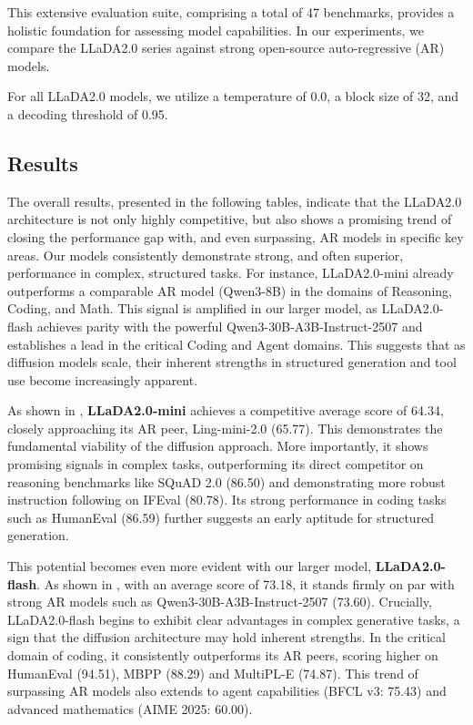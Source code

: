 This extensive evaluation suite, comprising a total of 47 benchmarks, provides a holistic foundation for assessing model capabilities. In our experiments, we compare the LLaDA2.0 series against strong open-source auto-regressive (AR) models.

For all LLaDA2.0 models, we utilize a temperature of 0.0, a block size of 32, and a decoding threshold of 0.95.

\subsection{Results}
The overall results, presented in the following tables, indicate that the LLaDA2.0 architecture is not only highly competitive, but also shows a promising trend of closing the performance gap with, and even surpassing, AR models in specific key areas. Our models consistently demonstrate strong, and often superior, performance in complex, structured tasks. For instance, LLaDA2.0-mini already outperforms a comparable AR model (Qwen3-8B) in the domains of Reasoning, Coding, and Math. This signal is amplified in our larger model, as LLaDA2.0-flash achieves parity with the powerful Qwen3-30B-A3B-Instruct-2507 and establishes a lead in the critical Coding and Agent domains. This suggests that as diffusion models scale, their inherent strengths in structured generation and tool use become increasingly apparent.




As shown in , \textbf{LLaDA2.0-mini} achieves a competitive average score of 64.34, closely approaching its AR peer, Ling-mini-2.0 (65.77). This demonstrates the fundamental viability of the diffusion approach. More importantly, it shows promising signals in complex tasks, outperforming its direct competitor on reasoning benchmarks like SQuAD 2.0 (86.50) and demonstrating more robust instruction following on IFEval (80.78). Its strong performance in coding tasks such as HumanEval (86.59) further suggests an early aptitude for structured generation.

This potential becomes even more evident with our larger model, \textbf{LLaDA2.0-flash}. As shown in , with an average score of 73.18, it stands firmly on par with strong AR models such as Qwen3-30B-A3B-Instruct-2507 (73.60). Crucially, LLaDA2.0-flash begins to exhibit clear advantages in complex generative tasks, a sign that the diffusion architecture may hold inherent strengths. In the critical domain of coding, it consistently outperforms its AR peers, scoring higher on HumanEval (94.51), MBPP (88.29) and MultiPL-E (74.87). This trend of surpassing AR models also extends to agent capabilities (BFCL v3: 75.43) and advanced mathematics (AIME 2025: 60.00).

